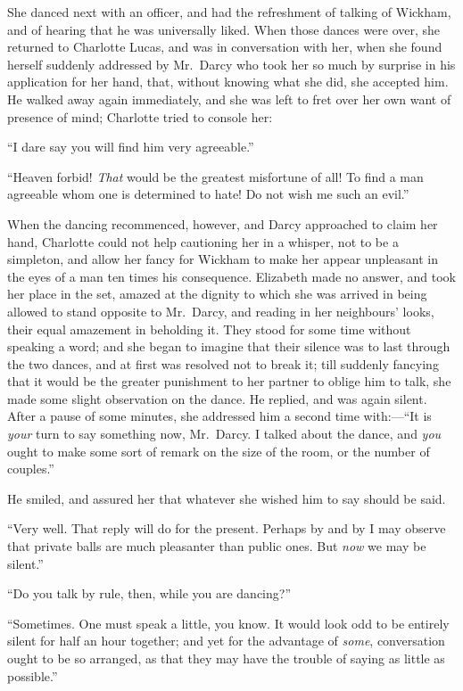 \documentclass[12pt,english]{book}
\begin{document}
She danced next with an officer, and had the refreshment of talking
of Wickham, and of hearing that he was universally liked. When those
dances were over, she returned to Charlotte Lucas, and was in conversation
with her, when she found herself suddenly addressed by Mr.\ Darcy
who took her so much by surprise in his application for her hand,
that, without knowing what she did, she accepted him. He walked away
again immediately, and she was left to fret over her own want of presence
of mind; Charlotte tried to console her:

{}``I dare say you will find him very agreeable.''

{}``Heaven forbid! \textit{That} would be the greatest misfortune
of all! To find a man agreeable whom one is determined to hate! Do
not wish me such an evil.''

When the dancing recommenced, however, and Darcy approached to claim
her hand, Charlotte could not help cautioning her in a whisper, not
to be a simpleton, and allow her fancy for Wickham to make her appear
unpleasant in the eyes of a man ten times his consequence. Elizabeth
made no answer, and took her place in the set, amazed at the dignity
to which she was arrived in being allowed to stand opposite to Mr.\ Darcy,
and reading in her neighbours' looks, their equal amazement in beholding
it. They stood for some time without speaking a word; and she began
to imagine that their silence was to last through the two dances,
and at first was resolved not to break it; till suddenly fancying
that it would be the greater punishment to her partner to oblige him
to talk, she made some slight observation on the dance. He replied,
and was again silent. After a pause of some minutes, she addressed
him a second time with:\mbox{---}{}``It is \textit{your} turn to
say something now, Mr.\ Darcy. I talked about the dance, and \textit{you}
ought to make some sort of remark on the size of the room, or the
number of couples.''

He smiled, and assured her that whatever she wished him to say should
be said.

{}``Very well. That reply will do for the present. Perhaps by and
by I may observe that private balls are much pleasanter than public
ones. But \textit{now} we may be silent.''

{}``Do you talk by rule, then, while you are dancing?''

{}``Sometimes. One must speak a little, you know. It would look odd
to be entirely silent for half an hour together; and yet for the advantage
of \textit{some}, conversation ought to be so arranged, as that they
may have the trouble of saying as little as possible.''
\end{document}
